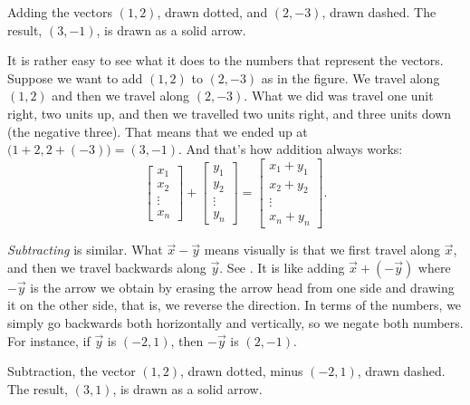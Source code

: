 \begin{myfig}
\capstart
{}
\caption{Adding the vectors $(1,2)$, drawn dotted, and $(2,-3)$, drawn dashed.  The
result, $(3,-1)$, is drawn as a solid arrow.\label{linalg-vecadd:fig}}
\end{myfig}

It is rather easy to see what it does to the numbers that represent the
vectors.  Suppose we want to add $(1,2)$ to $(2,-3)$ as in the figure.
We travel along $(1,2)$
and then we travel along $(2,-3)$.
What we did was travel one unit right, two units up, and then
we travelled two units right, and three units down (the negative three).  That
means that we ended up at $\bigl(1+2,2+(-3)\bigr) = (3,-1)$.
And that's how addition always works:
\begin{equation*}
\begin{bmatrix}
x_{1} \\ x_2 \\ \vdots \\ x_n
\end{bmatrix} +
\begin{bmatrix}
y_{1} \\ y_2 \\ \vdots \\ y_n
\end{bmatrix} =
\begin{bmatrix}
x_1 + y_{1} \\ x_2+ y_2 \\ \vdots \\ x_n + y_n
\end{bmatrix} .
\end{equation*}

\emph{Subtracting} is similar.
What $\vec{x}- \vec{y}$ means visually is that
we first travel along $\vec{x}$, and then we travel
backwards along $\vec{y}$.
See .
It is like adding
$\vec{x}+ (- \vec{y})$ where $-\vec{y}$
is the arrow we obtain by erasing the arrow head
from one side and drawing it on the other side, that is, we reverse the
direction.  In terms of the numbers, we simply go backwards both
horizontally and vertically,
so we negate both numbers.  For instance, if $\vec{y}$ is $(-2,1)$,
then $-\vec{y}$ is $(2,-1)$.

\begin{myfig}
\capstart
{}
\caption{Subtraction, the vector $(1,2)$, drawn dotted, minus $(-2,1)$,
drawn dashed.  The
result, $(3,1)$, is drawn as a solid arrow.\label{linalg-vecsub:fig}}
\end{myfig}

